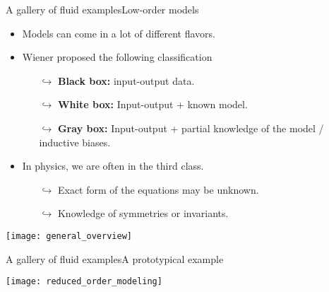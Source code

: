 \begin{frame}[t, c]{A gallery of fluid examples}{Low-order models}
	\begin{minipage}{.58\textwidth}
		\begin{itemize}
			\item Models can come in a lot of different flavors.

			\medskip

			\item Wiener proposed the following classification
			\begin{itemize}
				\item[\( \hookrightarrow	\)] \textbf{Black box:} input-output data.
				\item[\( \hookrightarrow	\)] \textbf{White box:} Input-output + known model.
				\item[\( \hookrightarrow	\)] \textbf{Gray box:} Input-output + partial knowledge of the model / inductive biases.
			\end{itemize}

			\medskip

			\item In physics, we are often in the third class.
			\begin{itemize}
				\item[\( \hookrightarrow	\)] Exact form of the equations may be unknown.
				\item[\( \hookrightarrow	\)] Knowledge of symmetries or invariants.
			\end{itemize}
		\end{itemize}
	\end{minipage}%
	\hfill
	\begin{minipage}{.38\textwidth}
		\texttt{[image: general\_overview]}
	\end{minipage}

	\vspace{1cm}
\end{frame}


\begin{frame}[t, c]{A gallery of fluid examples}{A prototypical example}

	\centering
	\texttt{[image: reduced\_order\_modeling]}

	\vspace{1cm}
\end{frame}

